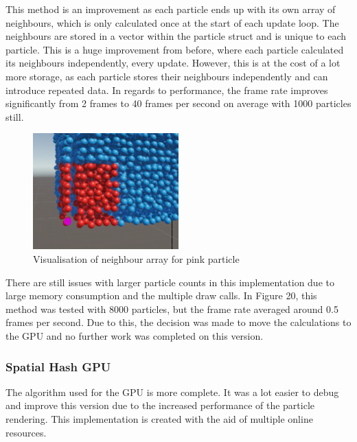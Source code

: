 \documentclass[12pt]{article}
\begin{document}
    This method is an improvement as each particle ends up with its own array of neighbours, which is only calculated once at the start of each update loop. The neighbours are stored in a vector within the particle struct and is unique to each particle. This is a huge improvement from before, where each particle calculated its neighbours independently, every update. However, this is at the cost of a lot more storage, as each particle stores their neighbours independently and can introduce repeated data. In regards to performance, the frame rate improves significantly from 2 frames to 40 frames per second on average with 1000 particles still.

    \begin{figure}[H]
        \begin{center}
            \includegraphics[width=0.5\textwidth]{neighboursCPU.png}
            \caption{Visualisation of neighbour array for pink particle}
        \end{center}
    \end{figure}

    There are still issues with larger particle counts in this implementation due to large memory consumption and the multiple draw calls. In Figure 20, this method was tested with 8000 particles, but the frame rate averaged around 0.5 frames per second. Due to this, the decision was made to move the calculations to the GPU and no further work was completed on this version.

    \subsubsection{Spatial Hash GPU}
    
    The algorithm used for the GPU is more complete. It was a lot easier to debug and improve this version due to the increased performance of the particle rendering. This implementation is created with the aid of multiple online resources\cite{lague}\cite{sphspatialexample}\cite{bitonicyt}\cite{bitonicparallel}.
\end{document}
